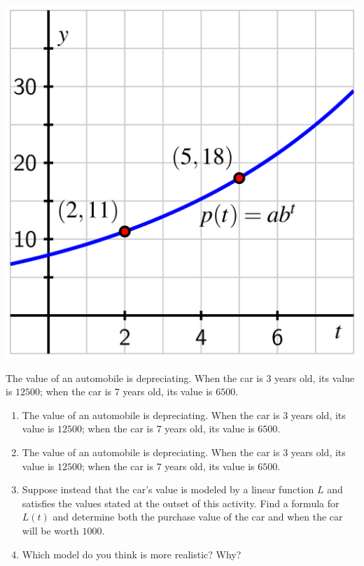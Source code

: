 \documentclass[nooutcomes]{ximera}
\begin{document}
\begin{example}
\begin{explanation}
\begin{image}
\includegraphics{growth-find-a-b.jpg}
\end{image}

\end{explanation}
\end{example}

\begin{exploration}
The value of an automobile is depreciating.  When the car is $3$ years old, its value is \textdollar{}$12500$; when the car is $7$ years old, its value is \textdollar{}$6500$.

\begin{enumerate}[label=\alph*.]
\item The value of an automobile is depreciating.  When the car is $3$ years old, its value is \textdollar{}$12500$; when the car is $7$ years old, its value is \textdollar{}$6500$.
\item The value of an automobile is depreciating.  When the car is $3$ years old, its value is \textdollar{}$12500$; when the car is $7$ years old, its value is \textdollar{}$6500$.
\item Suppose instead that the car's value is modeled by a linear function $L$ and satisfies the values stated at the outset of this activity.  Find a formula for $L(t)$ and determine both the purchase value of the car and when the car will be worth \textdollar{}$1000$.
\item Which model do you think is more realistic?  Why?
\end{enumerate}
\end{exploration}
\end{document}
